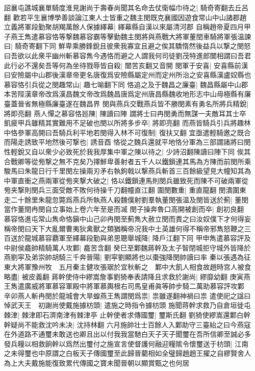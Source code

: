 詔襄屯譙城襄單騎度淮見謝尚于壽春尚聞其名命去仗衛幅巾待之|{
	騎奇寄翻去丘呂翻}
歡若平生襄博學善談論江東人士皆重之魏主閔既克襄國因遊食常山中山諸郡趙立義將軍段勤聚胡羯萬餘人保據繹幕|{
	繹幕縣自漢以來屬清河郡}
自稱趙帝夏四月甲子燕王雋遣慕容恪等撃魏慕容霸等擊勤魏主閔將與燕戰大將軍董閏車騎將軍張温諫曰|{
	騎奇寄翻下同}
鮮卑乘勝鋒銳且彼衆我寡宜且避之俟其驕惰然後益兵以撃之閔怒曰吾欲以此衆平幽州斬慕容雋今遇恪而避之人謂我何司徒劉茂特進郎闓相謂曰吾君此行必不還矣吾等何為坐待戮辱皆自殺|{
	闓苦亥翻又音開}
閔軍于安喜|{
	安喜縣前漢曰安險屬中山郡後漢章帝更名唐復爲安險縣屬定州而定州所治之安喜縣漢盧奴縣也}
慕容恪引兵從之閔趣常山|{
	趣七喻翻下同}
恪追之及于魏昌之廉臺|{
	魏昌縣屬中山郡本苦陘漢章帝改爲漢昌魏文帝改爲魏昌唐爲定州唐昌縣魏收地形志中山毋極縣有廉臺蓋晉省無極縣廉臺遂在魏昌界}
閔與燕兵交戰燕兵皆不勝閔素有勇名所將兵精銳|{
	將即亮翻}
燕人憚之慕容恪廵陳|{
	陳讀曰陣}
謂將士曰冉閔勇而無謀一夫敵耳其士卒飢疲甲兵雖精其實難用不足破也閔以所將多步卒|{
	將即亮翻}
而燕皆騎兵引兵將趣林中恪參軍高開曰吾騎兵利平地若閔得入林不可復制|{
	復扶又翻}
宜亟遣輕騎邀之既合而陽走誘致平地然後可撃也|{
	誘音酉}
恪從之魏兵還就平地恪分軍為三部謂諸將曰閔性輕銳又自以衆少必致死於我我厚集中軍之陳以待之|{
	少詩沼翻陳讀曰陣下同}
俟其合戰卿等從㫄撃之無不克矣乃擇鮮卑善射者五千人以鐵鎻連其馬為方陳而前閔所乘駿馬曰朱龍日行千里閔左操兩刃矛右執鉤戟以撃燕兵斬首三百餘級望見大幢知其為中軍直衝之燕兩軍從㫄夹撃大破之|{
	恪以鐵鎻連馬則閔兵雖致死而陳不可破兩軍從㫄夹撃則閔兵三面受敵不敗何待操千刀翻幢直江翻}
圍閔數重|{
	重直龍翻}
閔潰圍東走二十餘里朱龍忽斃爲燕兵所執燕人殺魏僕射劉羣執董閔張温及閔皆送於薊|{
	董閔當作董閏冉閔自立事始上卷六年至是而㓕}
閔子操奔魯口高開被創而卒|{
	創初良翻}
慕容恪進屯常山雋命恪鎭中山己卯冉閔至薊雋大赦立閔而責之曰汝奴僕下才何得妄稱帝閔曰天下大亂爾曹夷狄禽獸之類猶稱帝况我中土英雄何得不稱帝邪雋怒鞭之三百送於龍城慕容覇軍至繹幕段勤與弟思聰舉城降|{
	降戶江翻下同}
甲申雋遣慕容評及中尉侯龕帥精騎萬人攻鄴|{
	龕苦含翻}
癸巳至鄴魏蔣幹及太子智閉城拒守城外皆降於燕劉寜及弟崇帥胡騎三千奔晉陽|{
	劉寜劉顯將也以棗強降閔帥讀曰率}
秦以張遇為征東大將軍豫州牧　五月秦主健攻張琚於宜秋斬之　鄴中大飢人相食故趙時宫人被食略盡|{
	被皮義翻}
蔣幹使侍中繆嵩詹事劉猗奉表請降且求救於謝尚|{
	繆靡幼翻}
庚寅燕王雋遣廣威將軍慕容軍殿中將軍慕輿根右司馬皇甫眞等帥步騎二萬助慕容評攻鄴　辛卯燕人斬冉閔於龍城會大旱蝗燕王雋謂閔爲祟|{
	祟雖遂翻神禍曰祟}
遣使祀之諡曰悼武天王　初謝尚使戴施據枋頭|{
	遣施之時指令據枋頭}
施聞蒋幹求救乃自倉垣徙屯棘津|{
	棘津即石濟南津有棘津亭}
止幹使者求傳國璽|{
	璽斯氏翻}
劉猗使繆嵩還鄴白幹幹疑尚不能救沈吟未决|{
	沈持林翻}
六月施帥壮士百餘人入鄴助守三臺紿之曰今燕寇在外道路不通璽未敢送也卿且出以付我我當馳白天子天子聞璽在吾所信卿至誠必多發兵糧以相救餉幹以爲然出璽付之施宣言使督護何融迎糧隂令懷璽送于枋頭|{
	江南之未得璽也中原謂之白板天子傳國璽至此歸晉藺相如全璧歸趙趙王擢之自繆賢舍人為上大夫戴施能復致累代傳國之寶未聞晉朝以顯賞甄之也何居}
